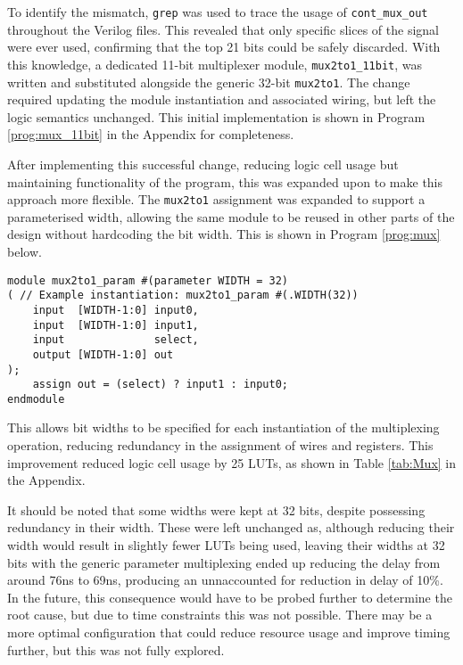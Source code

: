 \documentclass[a4paper,10pt]{article}
\begin{document}
To identify the mismatch, \texttt{grep} was used to trace the usage of 
\texttt{cont\_mux\_out} throughout the Verilog files. 
This revealed that only specific slices of the signal were ever used, 
confirming that the top 21 bits could be safely discarded. 
With this knowledge, a dedicated 11-bit multiplexer module, 
\texttt{mux2to1\_11bit}, was written and substituted alongside the 
generic 32-bit \texttt{mux2to1}. 
The change required updating the 
module instantiation and associated wiring, 
but left the logic semantics unchanged.
This initial implementation is shown in Program \ref{prog:mux_11bit}
in the Appendix for completeness.

After implementing this successful change, 
reducing logic cell usage but maintaining functionality of the program,
this was expanded upon to make this approach more flexible.
The \texttt{mux2to1} assignment was expanded to support a parameterised width, 
allowing the same module to be reused in other parts of the design 
without hardcoding the bit width. \cite{FPGA_optimization}
This is shown in Program \ref{prog:mux} below.

\begin{lstlisting}[style=verilog-style, caption=
    {Generic width multiplexer}, label={prog:mux}]
module mux2to1_param #(parameter WIDTH = 32)
( // Example instantiation: mux2to1_param #(.WIDTH(32))
    input  [WIDTH-1:0] input0,
    input  [WIDTH-1:0] input1,
    input              select,
    output [WIDTH-1:0] out
);
    assign out = (select) ? input1 : input0;
endmodule
\end{lstlisting}

This allows bit widths to be specified for each instantiation
of the multiplexing operation,
reducing redundancy in the assignment of wires and registers.
This improvement reduced logic cell usage by 25 LUTs, as shown in 
Table \ref{tab:Mux} in the Appendix.

It should be noted that some widths were kept at 32 bits,
despite possessing redundancy in their width.
These were left unchanged as, 
although reducing their width would result in slightly fewer LUTs being used,
leaving their widths at 32 bits with the generic parameter multiplexing 
ended up reducing the delay from around 76ns to 69ns,
producing an unnaccounted for reduction in delay of 10\%.
In the future, this consequence would have to be probed further
to determine the root cause, but due to time constraints this was not possible.
There may be a more optimal configuration that could reduce resource usage
and improve timing further, but this was not fully explored.
\end{document}
